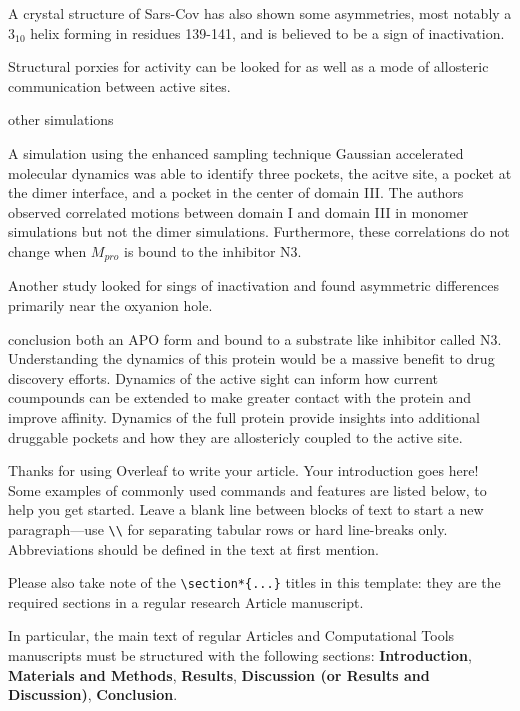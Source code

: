 \documentclass{biophys-new}
\begin{document}
A crystal structure of Sars-Cov has also shown some asymmetries, most notably a $3_{10}$ helix forming in residues 139-141, and is believed to be a sign of inactivation. \cite{yang2003crystal}

Structural porxies for activity can be looked for as well as a mode of allosteric communication between active sites.

other simulations

A simulation using the enhanced sampling technique Gaussian accelerated molecular dynamics was able to identify three pockets, the acitve site, a pocket at the dimer interface, and a pocket in the center of domain III. The authors observed correlated motions between domain I and domain III in monomer simulations but not the dimer simulations. Furthermore, these correlations do not change when $M_{pro}$ is bound to the inhibitor N3\cite{sztain2020elucidation}.

Another study looked for sings of inactivation and found asymmetric differences primarily near the oxyanion hole. \cite{inizan2021high}

conclusion
both an APO form and bound to a substrate like inhibitor called N3. Understanding the dynamics of this protein would be a massive benefit to drug discovery efforts. Dynamics of the active sight can inform how current coumpounds can be extended to make greater contact with the protein and improve affinity. Dynamics of the full protein provide insights into additional druggable pockets and how they are allostericly coupled to the active site.


Thanks for using Overleaf to write your article. Your introduction goes here! Some examples of commonly used commands and features are listed below, to help you get started. Leave a blank line between blocks of text to start a new paragraph---use \verb|\\| for separating tabular rows or hard line-breaks only. Abbreviations should be defined in the text at first mention.

Please also take note of the \verb|\section*{...}| titles in this template: they are the required sections in a regular research Article manuscript. 

In particular, the main text of regular Articles and Computational Tools manuscripts must be structured with the following sections: \textbf{Introduction}, \textbf{Materials and Methods}, \textbf{Results}, \textbf{Discussion (or Results and Discussion)}, \textbf{Conclusion}.
\end{document}
